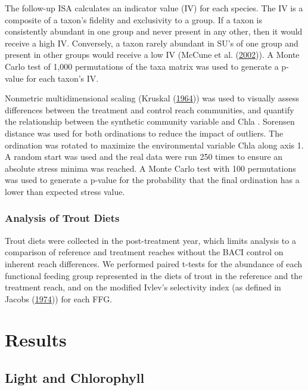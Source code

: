 \documentclass[double,12pt]{beavtex}
\begin{document}
  The follow-up ISA calculates an indicator value (IV) for each species.
  The IV is a composite of a taxon's fidelity and exclusivity to a group.
  If a taxon is consistently abundant in one group and never present in
  any other, then it would receive a high IV. Conversely, a taxon rarely
  abundant in SU's of one group and present in other groups would receive
  a low IV (McCune et al. (\protect\hyperlink{ref-McCune2002}{2002})). A
  Monte Carlo test of 1,000 permutations of the taxa matrix was used to
  generate a p-value for each taxon's IV.
  
  Nonmetric multidimensional scaling (Kruskal
  (\protect\hyperlink{ref-Kruskal1964}{1964})) was used to visually assess
  differences between the treatment and control reach communities, and
  quantify the relationship between the synthetic community variable and
  Chla . Sorensen distance was used for both ordinations to reduce the
  impact of outliers. The ordination was rotated to maximize the
  environmental variable Chla along axis 1. A random start was used and
  the real data were run 250 times to ensure an absolute stress minima was
  reached. A Monte Carlo test with 100 permutations was used to generate a
  p-value for the probability that the final ordination has a lower than
  expected stress value.
  
  \subsection*{Analysis of Trout Diets}\label{analysis-of-trout-diets}
  
  Trout diets were collected in the post-treatment year, which limits
  analysis to a comparison of reference and treatment reaches without the
  BACI control on inherent reach differences. We performed paired t-tests
  for the abundance of each functional feeding group represented in the
  diets of trout in the reference and the treatment reach, and on the
  modified Ivlev's selectivity index (as defined in Jacobs
  (\protect\hyperlink{ref-Jacobs1974}{1974})) for each FFG.
  
  \chapter*{Results}\label{results}
  
  \section*{Light and Chlorophyll}\label{light-and-chlorophyll}
  
\end{document}

